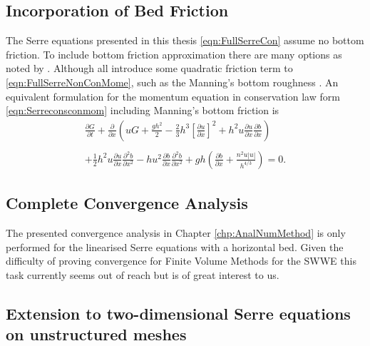 \subsection{Incorporation of Bed Friction}
The Serre equations presented in this thesis \eqref{eqn:FullSerreCon} assume no bottom friction. To include bottom friction approximation there are many options as noted by \citet{DoCarmo-2019-125}. Although all introduce some quadratic friction term to \eqref{eqn:FullSerreNonConMome}, such as the Manning's bottom roughness \cite{Tissier-2011,Filippini-etal-2016-381,DoCarmo-2019-125}. An equivalent formulation for the momentum equation in conservation law form \eqref{eqn:Serreconsconmom} including Manning's bottom friction \cite{ChowVenTe} is 
\begin{equation}
	\begin{split}
		\frac{\partial G}{\partial t}  + \frac{\partial}{\partial x} \left( {u} G + \frac{gh^2}{2} -  \frac{2}{3}h^3 \left[\frac{\partial {u}}{\partial x}\right]^2 + h^2 {u}\frac{\partial {u}}{\partial x}\frac{\partial b}{\partial x} \right) \\ \\ +   \frac{1}{2}h^2 {u} \frac{\partial {u}}{\partial x} \frac{\partial^2 b}{\partial x^2}  - h {u}^2\frac{\partial b}{\partial x}\frac{\partial^2 b}{\partial x^2}  + gh \left(\frac{\partial b}{\partial x} + \frac{n^2 u \left|u\right|}{h^{4/3}} \right)   = 0.
	\end{split}
\end{equation}

\subsection{Complete Convergence Analysis}
The presented convergence analysis in Chapter \ref{chp:AnalNumMethod} is only performed for the linearised Serre equations with a horizontal bed. Given the difficulty of proving convergence for Finite Volume Methods for the SWWE \cite{LeVeque-2002} this task currently seems out of reach but is of great interest to us.

\subsection{Extension to two-dimensional Serre equations on unstructured meshes}




